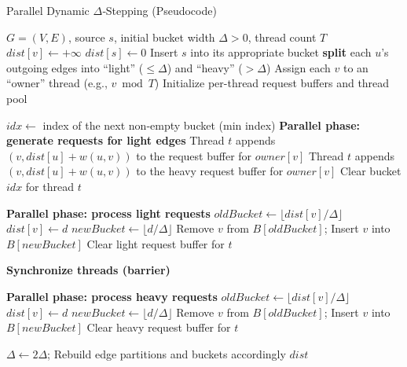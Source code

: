\documentclass[12pt]{article}
\begin{document}
\begin{algorithm}
\caption{Parallel Dynamic $\Delta$‐Stepping (Pseudocode)}
\label{alg:parallel_delta_stepping}
\begin{algorithmic}[1]
\Require 
    $G = (V, E)$, source $s$, initial bucket width $\Delta > 0$, thread count $T$
    \State $dist[v] \gets +\infty$
\EndFor
\State $dist[s] \gets 0$
\State Insert $s$ into its appropriate bucket
\State \textbf{split} each $u$'s outgoing edges into ``light'' ($\leq \Delta$) and ``heavy'' ($>\Delta$)
\State Assign each $v$ to an ``owner'' thread (e.g., $v \bmod T$)
\State Initialize per-thread request buffers and thread pool

    \State $idx \gets$ index of the next non-empty bucket (min index)
    \Repeat
        \State \textbf{Parallel phase: generate requests for light edges}
                    \State Thread $t$ appends $(v, dist[u] + w(u,v))$ to the request buffer for $owner[v]$
                \EndFor
                    \State Thread $t$ appends $(v, dist[u] + w(u,v))$ to the heavy request buffer for $owner[v]$
                \EndFor
            \EndFor
            \State Clear bucket $idx$ for thread $t$
        \EndFor

        \State \textbf{Parallel phase: process light requests}
                    \State $oldBucket \gets \lfloor dist[v] / \Delta \rfloor$
                    \State $dist[v] \gets d$
                    \State $newBucket \gets \lfloor d / \Delta \rfloor$
                    \State Remove $v$ from $B[oldBucket]$; Insert $v$ into $B[newBucket]$
                \EndIf
            \EndFor
            \State Clear light request buffer for $t$
        \EndFor

        \State \textbf{Synchronize threads (barrier)}
    
    \State \textbf{Parallel phase: process heavy requests}
                \State $oldBucket \gets \lfloor dist[v] / \Delta \rfloor$
                \State $dist[v] \gets d$
                \State $newBucket \gets \lfloor d / \Delta \rfloor$
                \State Remove $v$ from $B[oldBucket]$; Insert $v$ into $B[newBucket]$
            \EndIf
        \EndFor
        \State Clear heavy request buffer for $t$
    \EndFor

        \State $\Delta \gets 2\Delta$; Rebuild edge partitions and buckets accordingly
    \EndIf
\EndWhile
\State \Return $dist$
\end{algorithmic}
\end{algorithm}
\end{document}
